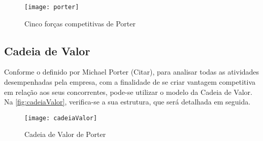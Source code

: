 \begin{figure}[htb]
	\caption{\label{fig:porter}Cinco forças competitivas de Porter}
	\begin{center}
	    \texttt{[image: porter]}
	\end{center}
\end{figure}

\subsection{Cadeia de Valor}

Conforme o definido por Michael Porter (Citar), para analisar todas as atividades desempenhadas pela empresa, com a finalidade de se criar vantagem competitiva em relação aos seus concorrentes, pode-se utilizar o modelo da Cadeia de Valor. Na \autoref{fig:cadeiaValor}, verifica-se a sua estrutura, que será detalhada em seguida.

\begin{figure}[htb]
	\caption{\label{fig:cadeiaValor}Cadeia de Valor de Porter}
	\begin{center}
	    \texttt{[image: cadeiaValor]}
	\end{center}
\end{figure}

